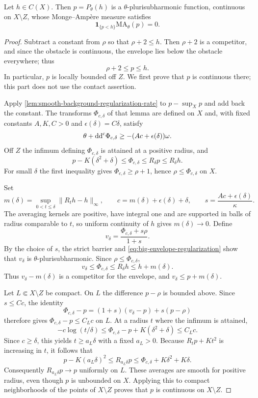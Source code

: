 \begin{theorem}\label{thm:big-continuous-envelope-contact}
Let $h\in C(X)$. Then $p=P_\theta(h)$ is a $\theta$-plurisubharmonic function, continuous on $X\setminus Z$, whose Monge--Amp\`ere measure satisfies
\[
 \mathbf1_{\{p<h\}}\mathrm{MA}_\theta(p)=0.
\]
\end{theorem}
\begin{proof}
Subtract a constant from $\rho$ so that $\rho+2\leq h$. Then $\rho+2$ is a competitor, and since the obstacle is continuous, the envelope lies below the obstacle everywhere; thus
\[
 \rho+2\leq p\leq h.
\]
In particular, $p$ is locally bounded off $Z$. We first prove that $p$ is continuous there; this part does not use the contact assertion.

Apply \cref{lem:smooth-background-regularization-rate} to $p-\sup_Xp$ and add back the constant. The transforms $\Phi_{c,\delta}$ of that lemma are defined on $X$ and, with fixed constants $A,K,C>0$ and $\epsilon(\delta)=C\delta$, satisfy
\begin{equation}\label{eq:big-envelope-regularization}
 \theta+\mathrm{dd}^{\mathrm{c}}\Phi_{c,\delta}\geq-(Ac+\epsilon(\delta))\omega.
\end{equation}
Off $Z$ the infimum defining $\Phi_{c,\delta}$ is attained at a positive radius, and
\[
 p-K(\delta^2+\delta)\leq\Phi_{c,\delta}
       \leq R_\delta p\leq R_\delta h.
\]
For small $\delta$ the first inequality gives $\Phi_{c,\delta}\geq\rho+1$, hence $\rho\leq\Phi_{c,\delta}$ on $X$.

Set
\[
 m(\delta)=\sup_{0<t\leq\delta}\|R_th-h\|_\infty,
 \qquad c=m(\delta)+\epsilon(\delta)+\delta,
 \qquad s=\frac{Ac+\epsilon(\delta)}{\kappa}.
\]
The averaging kernels are positive, have integral one and are supported in balls of radius comparable to $t$, so uniform continuity of $h$ gives $m(\delta)\to0$. Define
\[
 v_\delta=\frac{\Phi_{c,\delta}+s\rho}{1+s}.
\]
By the choice of $s$, the strict barrier and \eqref{eq:big-envelope-regularization} show that $v_\delta$ is $\theta$-plurisubharmonic. Since $\rho\leq\Phi_{c,\delta}$,
\[
 v_\delta\leq\Phi_{c,\delta}\leq R_\delta h\leq h+m(\delta).
\]
Thus $v_\delta-m(\delta)$ is a competitor for the envelope, and $v_\delta\leq p+m(\delta)$.

Let $L\Subset X\setminus Z$ be compact. On $L$ the difference $p-\rho$ is bounded above. Since $s\leq Cc$, the identity
\[
 \Phi_{c,\delta}-p=(1+s)(v_\delta-p)+s(p-\rho)
\]
therefore gives $\Phi_{c,\delta}-p\leq C_Lc$ on $L$. At a radius $t$ where the infimum is attained,
\[
 -c\log(t/\delta)
        \leq\Phi_{c,\delta}-p+K(\delta^2+\delta)\leq C_Lc.
\]
Since $c\geq\delta$, this yields $t\geq a_L\delta$ with a fixed $a_L>0$. Because $R_tp+Kt^2$ is increasing in $t$, it follows that
\[
 p-K(a_L\delta)^2\leq R_{a_L\delta}p
       \leq\Phi_{c,\delta}+K\delta^2+K\delta.
\]
Consequently $R_{a_L\delta}p\to p$ uniformly on $L$. These averages are smooth for positive radius, even though $p$ is unbounded on $X$. Applying this to compact neighborhoods of the points of $X\setminus Z$ proves that $p$ is continuous on $X\setminus Z$.


\end{proof}
